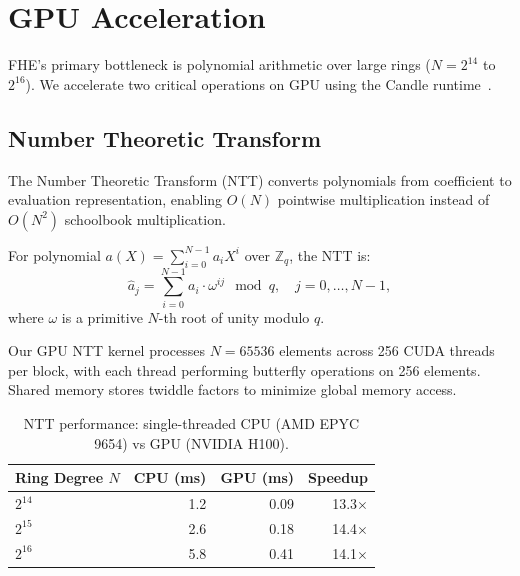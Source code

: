 \section{GPU Acceleration}

\label{sec:gpu}

FHE's primary bottleneck is polynomial arithmetic over large rings
($N = 2^{14}$ to $2^{16}$). We accelerate two critical operations on GPU using
the Candle runtime~\cite{hanzocandle}.

\subsection{Number Theoretic Transform}

The Number Theoretic Transform (NTT) converts polynomials from coefficient to
evaluation representation, enabling $O(N)$ pointwise multiplication instead of
$O(N^2)$ schoolbook multiplication.

\begin{definition}[NTT]
For polynomial $a(X) = \sum_{i=0}^{N-1} a_i X^i$ over $\mathbb{Z}_q$, the NTT
is:
\begin{equation}
\hat{a}_j = \sum_{i=0}^{N-1} a_i \cdot \omega^{ij} \mod q,
\quad j = 0, \ldots, N-1,
\end{equation}
where $\omega$ is a primitive $N$-th root of unity modulo $q$.
\end{definition}

Our GPU NTT kernel processes $N = 65536$ elements across 256 CUDA threads per
block, with each thread performing butterfly operations on 256 elements. Shared
memory stores twiddle factors to minimize global memory access.

\begin{table}[H]
\centering
\small
\begin{tabular}{lrrr}
\toprule
\textbf{Ring Degree $N$} & \textbf{CPU (ms)} & \textbf{GPU (ms)} & \textbf{Speedup} \\
\midrule
$2^{14}$ & 1.2 & 0.09 & 13.3$\times$ \\
$2^{15}$ & 2.6 & 0.18 & 14.4$\times$ \\
$2^{16}$ & 5.8 & 0.41 & 14.1$\times$ \\
\bottomrule
\end{tabular}
\caption{NTT performance: single-threaded CPU (AMD EPYC 9654) vs GPU (NVIDIA H100).}
\label{tab:ntt}
\end{table}


